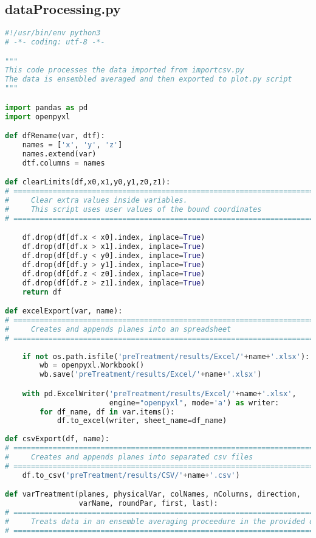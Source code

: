 \subsection{dataProcessing.py}
\begin{lstlisting}[language=python]
#!/usr/bin/env python3
# -*- coding: utf-8 -*-

"""
This code processes the data imported from importcsv.py
The data is ensembled averaged and then exported to plot.py script
"""

import pandas as pd
import openpyxl

def dfRename(var, dtf):
    names = ['x', 'y', 'z']
    names.extend(var)
    dtf.columns = names

def clearLimits(df,x0,x1,y0,y1,z0,z1):
# =============================================================================
#     Clear extra values inside variables.
#     This script uses user values of the bound coordinates
# =============================================================================

    df.drop(df[df.x < x0].index, inplace=True)
    df.drop(df[df.x > x1].index, inplace=True)
    df.drop(df[df.y < y0].index, inplace=True)
    df.drop(df[df.y > y1].index, inplace=True)
    df.drop(df[df.z < z0].index, inplace=True)
    df.drop(df[df.z > z1].index, inplace=True)
    return df

def excelExport(var, name):
# =============================================================================
#     Creates and appends planes into an spreadsheet
# =============================================================================
    
    if not os.path.isfile('preTreatment/results/Excel/'+name+'.xlsx'):
        wb = openpyxl.Workbook()
        wb.save('preTreatment/results/Excel/'+name+'.xlsx')

    with pd.ExcelWriter('preTreatment/results/Excel/'+name+'.xlsx',
                        engine="openpyxl", mode='a') as writer:
        for df_name, df in var.items():
            df.to_excel(writer, sheet_name=df_name)
            
def csvExport(df, name):
# =============================================================================
#     Creates and appends planes into separated csv files
# =============================================================================
    df.to_csv('preTreatment/results/CSV/'+name+'.csv')

def varTreatment(planes, physicalVar, colNames, nColumns, direction,
                 varName, roundPar, first, last):
# =============================================================================
#     Treats data in an ensemble averaging proceedure in the provided direction
# =============================================================================


\end{lstlisting}
